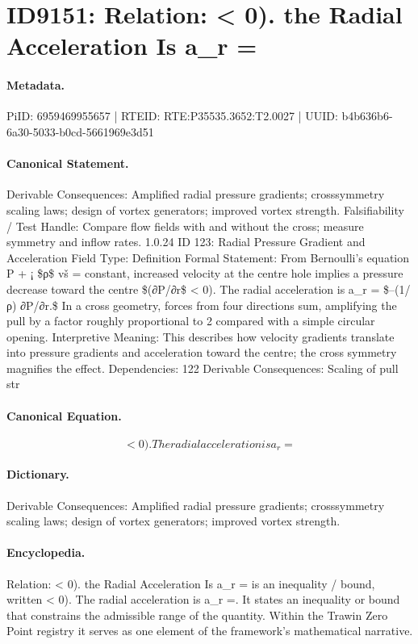 \section*{ID9151: Relation: < 0). the Radial Acceleration Is a\_r =}
\paragraph{Metadata.}
PiID: 6959469955657 | RTEID: RTE:P35535.3652:T2.0027 | UUID: b4b636b6-6a30-5033-b0cd-5661969e3d51

\paragraph{Canonical Statement.}
Derivable Consequences: Amplified radial pressure gradients; crosssymmetry scaling laws; design of vortex generators; improved vortex strength. Falsifiability / Test Handle: Compare flow fields with and without the cross; measure symmetry and inflow rates. 1.0.24 ID 123: Radial Pressure Gradient and Acceleration Field Type: Definition Formal Statement: From Bernoulli’s equation P + ¡ \$ρ\$ vš = constant, increased velocity at the centre hole implies a pressure decrease toward the centre \$(∂P/∂r\$ < 0). The radial acceleration is a\_r = \$–(1/ρ) ∂P/∂r.\$ In a cross geometry, forces from four directions sum, amplifying the pull by a factor roughly proportional to 2 compared with a simple circular opening. Interpretive Meaning: This describes how velocity gradients translate into pressure gradients and acceleration toward the centre; the cross symmetry magnifies the effect. Dependencies: 122 Derivable Consequences: Scaling of pull str

\paragraph{Canonical Equation.}
\[
< 0). The radial acceleration is a_r =
\]

\paragraph{Dictionary.}
Derivable Consequences: Amplified radial pressure gradients; crosssymmetry scaling laws; design of vortex generators; improved vortex strength.

\paragraph{Encyclopedia.}
Relation: < 0). the Radial Acceleration Is a\_r = is an inequality / bound, written < 0). The radial acceleration is a\_r =. It states an inequality or bound that constrains the admissible range of the quantity. Within the Trawin Zero Point registry it serves as one element of the framework's mathematical narrative.
